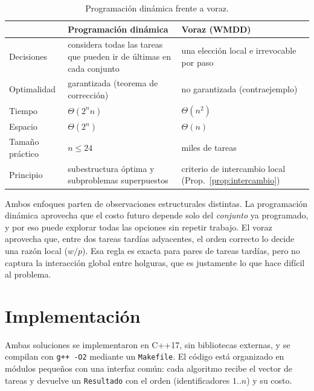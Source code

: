 \documentclass[10pt,twocolumn,letterpaper]{article}
\begin{document}
\begin{table}[h]
\centering
\caption{Programación dinámica frente a voraz.}\label{tab:comp}
\small
\setlength{\tabcolsep}{3pt}\begin{tabular}{>{\raggedright\arraybackslash}p{1.8cm}>{\raggedright\arraybackslash}p{2.8cm}>{\raggedright\arraybackslash}p{2.8cm}}
\toprule
 & Programación dinámica & Voraz (WMDD)\\
\midrule
Decisiones & considera todas las tareas que pueden ir de últimas en cada conjunto & una elección local e irrevocable por paso\\
Optimalidad & garantizada (teorema de corrección) & no garantizada (contraejemplo)\\
Tiempo & $\Theta(2^n n)$ & $\Theta(n^2)$\\
Espacio & $\Theta(2^n)$ & $\Theta(n)$\\
Tamaño práctico & $n\le24$ & miles de tareas\\
Principio & subestructura óptima y subproblemas superpuestos & criterio de intercambio local (Prop.~\ref{prop:intercambio})\\
\bottomrule
\end{tabular}
\end{table}

Ambos enfoques parten de observaciones estructurales distintas. La
programación dinámica aprovecha que el costo futuro depende solo del
\emph{conjunto} ya programado, y por eso puede explorar todas las opciones sin
repetir trabajo. El voraz aprovecha que, entre dos tareas tardías adyacentes,
el orden correcto lo decide una razón local ($w/p$). Esa regla es exacta para
pares de tareas tardías, pero no captura la interacción global entre holguras,
que es justamente lo que hace difícil al problema.

\section{Implementación}

Ambas soluciones se implementaron en C++17, sin bibliotecas externas, y se
compilan con \texttt{g++ -O2} mediante un \texttt{Makefile}. El código está
organizado en módulos pequeños con una interfaz común: cada algoritmo recibe el
vector de tareas y devuelve un \texttt{Resultado} con el orden (identificadores
$1..n$) y su costo.
\end{document}

